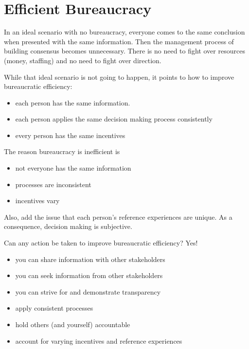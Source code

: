 
\section{Efficient Bureaucracy}

In an ideal scenario with no bureaucracy, everyone comes to the same conclusion when presented with the same information. Then the management process of building consensus becomes unnecessary. There is no need to fight over resources (money, staffing) and no need to fight over direction.

While that ideal scenario is not going to happen, it points to how to improve bureaucratic efficiency:
\begin{itemize}
\item each person has the same information. 
\item each person applies the same decision making process consistently
\item every person has the same incentives
\end{itemize}
The reason bureaucracy is inefficient is
\begin{itemize}
\item not everyone has the same information
\item processes are inconsistent
\item incentives vary
\end{itemize}
Also, add the issue that each person's reference experiences are unique. As a consequence, decision making is subjective. 

Can any action be taken to improve bureaucratic efficiency? Yes!
\begin{itemize}
\item you can share information with other stakeholders
\item you can seek information from other stakeholders
\item you can strive for and demonstrate transparency
\item apply consistent processes 
\item hold others (and yourself) accountable 
\item account for varying incentives and reference experiences
\end{itemize}
